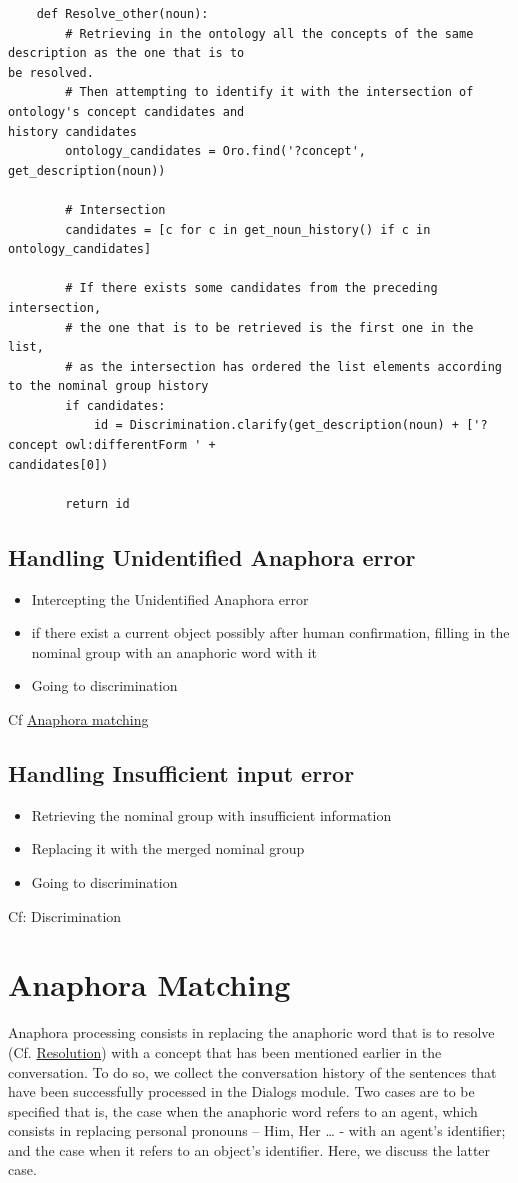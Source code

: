 \documentclass[twoside,a4paper,10pt]{report}
\newcommand{\dokutitleleveltwo}[1]{\chapter{#1}}
\newcommand{\dokutitleleveltree}[1]{\section{#1}}
\newcommand{\dokuitem}{\item}
\begin{document}
\lstset{language=python}
\begin{lstlisting}
    def Resolve_other(noun):
        # Retrieving in the ontology all the concepts of the same description as the one that is to
be resolved.
        # Then attempting to identify it with the intersection of ontology's concept candidates and
history candidates
        ontology_candidates = Oro.find('?concept', get_description(noun))
        
        # Intersection
        candidates = [c for c in get_noun_history() if c in ontology_candidates]
        
        # If there exists some candidates from the preceding intersection, 
        # the one that is to be retrieved is the first one in the list,
        # as the intersection has ordered the list elements according to the nominal group history
        if candidates:
            id = Discrimination.clarify(get_description(noun) + ['?concept owl:differentForm ' +
candidates[0])
                
        return id

\end{lstlisting}

\dokutitleleveltree{Handling Unidentified Anaphora error}
\label{e79def79eebc0ce87924efaa796970ff}%

\begin{itemize}
\dokuitem  Intercepting the Unidentified Anaphora error
\dokuitem  if there exist a current object possibly after human confirmation, filling in the nominal group with an anaphoric word with it
\dokuitem  Going to discrimination
\end{itemize}

Cf \hyperref[4873f0687cc3361050cff094f296df2d]{Anaphora matching}


\dokutitleleveltree{Handling Insufficient input error}
\label{a9b6979d4ccc758341445731028f7332}%

\begin{itemize}
\dokuitem  Retrieving the nominal group with insufficient information
\dokuitem  Replacing it with the merged nominal group
\dokuitem  Going to discrimination
\end{itemize}

Cf: Discrimination


\dokutitleleveltwo{Anaphora Matching}
\label{4873f0687cc3361050cff094f296df2d}%

Anaphora processing consists in replacing the anaphoric word that is to resolve (Cf. \hyperref[b7e164b34ff76b1cda93a058604190da]{Resolution}) with a concept that has been mentioned earlier in the conversation. To do so, we collect the conversation history of the sentences that have been successfully processed in the Dialogs module.
Two cases are to be specified that is, the case when the anaphoric word refers to an agent, which consists in replacing personal pronouns – Him, Her … - with an agent’s identifier; and the case when it  refers to an object’s identifier. Here, we discuss the latter case.
\end{document}
